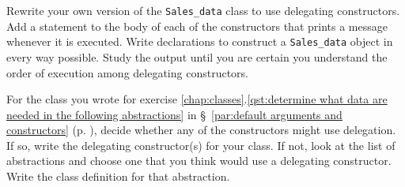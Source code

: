 %
%
\begin{question}
Rewrite your own version of the \verb|Sales_data| class to use
delegating constructors. Add a statement to the body of each of the
constructors that prints a message whenever it is executed. Write
declarations to construct a \verb|Sales_data| object in every way possible. Study
the output until you are certain you understand the order of execution among
delegating constructors.
\end{question}

\begin{question}
For the class you wrote for exercise \ref{chap:classes}.\ref{qst:determine what data are needed in the following abstractions} in \S~\ref{par:default arguments and constructors} (p. \pageref{par:default arguments and constructors}),
decide whether any of the constructors might use delegation. If so, write the
delegating constructor(s) for your class. If not, look at the list of abstractions
and choose one that you think would use a delegating constructor. Write the
class definition for that abstraction.
\end{question}
